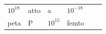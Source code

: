 {\begin{tabular}[t]{|l|l|l|l|l|l|}
                \begin{math}{10}^{18}\end{math}
               &
    
    
        atto &
    
    
        a &
    
    
        
                \begin{math}{10}^{-18}\end{math}
     \tabularnewline\cline{1-1}\cline{2-2}\cline{3-3}\cline{4-4}\cline{5-5}\cline{6-6}
    
    
        peta &
    
    
        P &
    
    
        
                \begin{math}{10}^{15}\end{math}
               &
    
    
        femto &
    

\end{tabular}}
